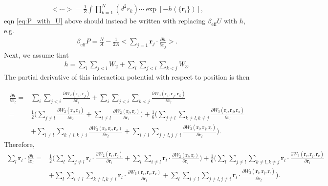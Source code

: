 \documentclass[../main.tex]{subfiles}
\begin{document}
\begin{align}
  <\cdots> = \frac{1}{Z}
  \int\prod_{k=1}^N(d^2r_k)
  \cdots\exp[-h(\{\bm{r}_i\})],
\end{align}
eqn \ref{eq:P_with_U} above should instead be written with replacing
$\beta_{\mathrm{eff}} U$ with $h$, e.g.
\begin{align}\label{eq:P_with_U}
  \beta_{\mathrm{eff}} P = \frac{N}{A}
  -\frac{1}{2A}\bigg<\sum_{j=1}\bm{r}_j\cdot
  \frac{\partial h}{\partial\bm{r}_j}\bigg>.
\end{align}
Next, we assume that
\begin{align}
  h = \sum_{i}\sum_{j<i}W_2+\sum_{i}\sum_{j<i}\sum_{k<j}W_3.
\end{align}
The partial derivative of this interaction potential with respect
to position is then
\begin{widetext}
  \begin{align}
    \frac{\partial h}{\partial \bm{r}_l}
    =& \sum_{i}\sum_{j<i}
    \frac{\partial W_2(\bm{r}_i,\bm{r}_j)}{\partial \bm{r}_l}
    +\sum_{i}\sum_{j<i}\sum_{k<j}
    \frac{\partial W_3(\bm{r}_i,\bm{r}_j,\bm{r}_k)}{\partial \bm{r}_l}
    \nonumber\\
    =& \frac{1}{2}\bigg(\sum_{j\neq l}
    \frac{\partial W_2(\bm{r}_l,\bm{r}_j)}{\partial \bm{r}_l}
    +\sum_{i\neq l}
    \frac{\partial W_2(\bm{r}_i,\bm{r}_l)}{\partial \bm{r}_l}\bigg)
    +\frac{1}{6}\bigg(\sum_{j\neq l}\sum_{k\neq l,k\neq j}
    \frac{\partial W_3(\bm{r}_l,\bm{r}_j,\bm{r}_k)}{\partial \bm{r}_l}
    \nonumber\\
    &+\sum_{i\neq l}\sum_{k\neq l, k\neq i}
    \frac{\partial W_3(\bm{r}_i,\bm{r}_l,\bm{r}_k)}{\partial \bm{r}_l}
    +\sum_{i\neq l}\sum_{j\neq l,j\neq i}
    \frac{\partial W_3(\bm{r}_i,\bm{r}_j,\bm{r}_l)}{\partial \bm{r}_l}
    \bigg).
  \end{align}
  Therefore,
  \begin{align}
    \sum_l\bm{r}_l\cdot\frac{\partial h}{\partial \bm{r}_l}
    =&\frac{1}{2}\bigg(\sum_l\sum_{j\neq l}\bm{r}_l\cdot
    \frac{\partial W_2(\bm{r}_l,\bm{r}_j)}{\partial \bm{r}_l}
    +\sum_l\sum_{i\neq l}\bm{r}_l\cdot
    \frac{\partial W_2(\bm{r}_i,\bm{r}_l)}{\partial \bm{r}_l}\bigg)
    +\frac{1}{6}\bigg(\sum_l\sum_{j\neq l}\sum_{k\neq l,k\neq j}
    \bm{r}_l\cdot
    \frac{\partial W_3(\bm{r}_l,\bm{r}_j,\bm{r}_k)}{\partial \bm{r}_l}
    \nonumber\\
    &+\sum_l\sum_{i\neq l}\sum_{k\neq l, k\neq i}\bm{r}_l\cdot
    \frac{\partial W_3(\bm{r}_i,\bm{r}_l,\bm{r}_k)}{\partial \bm{r}_l}
    +\sum_l\sum_{i\neq l}\sum_{j\neq l,j\neq i}\bm{r}_l\cdot
    \frac{\partial W_3(\bm{r}_i,\bm{r}_j,\bm{r}_l)}{\partial \bm{r}_l}
    \bigg).
  \end{align}
\end{widetext}
\end{document}
